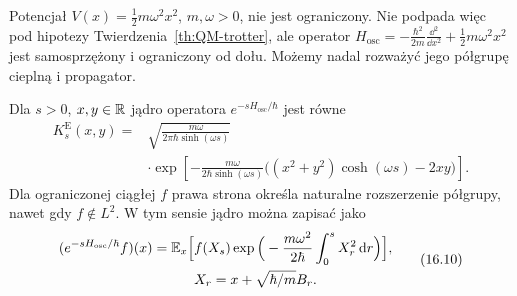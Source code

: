 Potencjał $V(x)=\frac12 m\omega^2x^2$, $m,\omega>0$,
nie jest ograniczony. Nie podpada więc pod hipotezy
Twierdzenia~\ref{th:QM-trotter}, ale operator
$H_{\mathrm{osc}}=-\frac{\hbar^2}{2m}\frac{\dd^2}{\dd x^2}
+\frac12m\omega^2x^2$ jest samosprzężony i
ograniczony od dołu. Możemy nadal rozważyć jego
półgrupę cieplną i propagator.

\begin{twierdzenie}
\label{th:Mehler-euclidean}
Dla $s>0$, $x,y\in\mathbb{R}$ jądro operatora
$e^{-sH_{\mathrm{osc}}/\hbar}$ jest równe
\[
\begin{split}
 K_s^{\mathrm E}(x,y)
  ={}&\sqrt{\frac{m\omega}{2\pi\hbar\sinh(\omega s)}}\\
 &\cdot\exp\left[-\frac{m\omega}{2\hbar\sinh(\omega s)}
 \bigl((x^2+y^2)\cosh(\omega s)-2xy\bigr)\right].
\end{split}
\tag{16.9}\label{eq:Mehler-E}
\]
Dla ograniczonej ciągłej $f$ prawa strona określa
naturalne rozszerzenie półgrupy, nawet gdy $f\notin L^2$.
W tym sensie jądro można zapisać jako
\[
\begin{split}
 (e^{-sH_{\mathrm{osc}}/\hbar}f)(x)
 =\mathbb{E}_x\Big[&f(X_s)\exp\Big(
  -\frac{m\omega^2}{2\hbar}\int_0^sX_r^2\,\mathrm{d} r
 \Big)\Big],\\
 &X_r=x+\sqrt{\hbar/m}B_r.
\end{split}
\tag{16.10}\label{eq:Mehler-FK}
\]
\end{twierdzenie}
